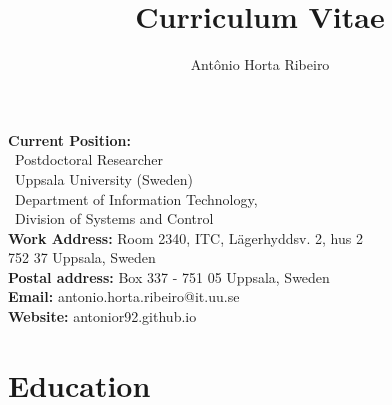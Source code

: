 \documentclass[10pt,letterpaper]{article} %
\title{Curriculum Vitae}
\author{Ant\^onio Horta Ribeiro}
\begin{document}
\maketitle

\begin{tcolorbox}[standard jigsaw, opacityback=0]
    \vspace{-4pt}
\begin{multicols}{2}
    \small
    \textbf{Current Position:}\\
    \, Postdoctoral Researcher\\
    \, Uppsala University (Sweden)\\
    \, Department of Information Technology,\\
    \, Division of Systems and Control\\
    {\bf Work Address:} Room 2340, ITC, Lägerhyddsv. 2, hus 2 \\
    \phantom{\bf Work address:} 752 37 Uppsala, Sweden\\
    {\bf Postal address:} Box 337 - 751 05 Uppsala, Sweden\\
    {\bf Email:} antonio.horta.ribeiro@it.uu.se\\
    {\bf Website:} antonior92.github.io
\end{multicols}
\end{tcolorbox}


\section*{Education} %
\end{document}
